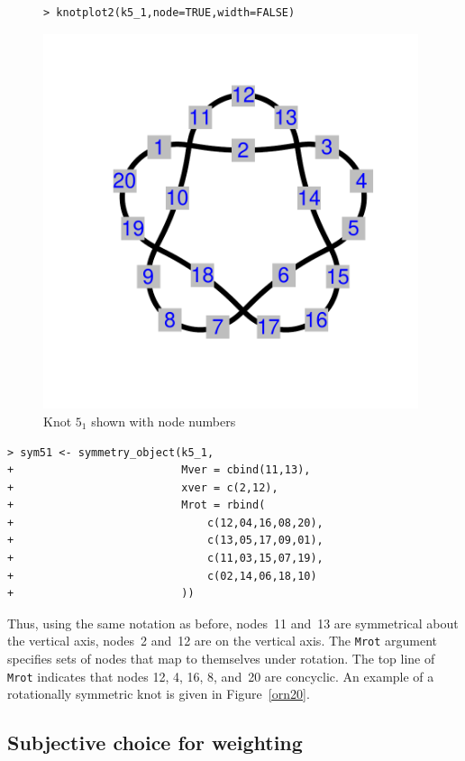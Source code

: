 \documentclass{birkjour}
\theoremstyle{definition}
\theoremstyle{remark}
\numberwithin{equation}{section}
\begin{document}
\begin{figure}[htbp]
  \begin{center}
\begin{verbatim}
> knotplot2(k5_1,node=TRUE,width=FALSE)
\end{verbatim}
\includegraphics[width=11cm]{knot-k5_1}  %
\caption{Knot $5_1$ \label{k5_1_twoknots} shown with node numbers}
  \end{center}
\end{figure}

\begin{verbatim}
> sym51 <- symmetry_object(k5_1,
+                          Mver = cbind(11,13),
+                          xver = c(2,12),
+                          Mrot = rbind(
+                              c(12,04,16,08,20),
+                              c(13,05,17,09,01),
+                              c(11,03,15,07,19),
+                              c(02,14,06,18,10)
+                          ))
\end{verbatim}

Thus, using the same notation as before, nodes~11 and~13 are
symmetrical about the vertical axis, nodes~2 and~12 are on the
vertical axis.  The {\tt Mrot} argument specifies sets of nodes that
map to themselves under rotation.  The top line of {\tt Mrot}
indicates that nodes 12, 4, 16, 8, and~20 are concyclic.  An example
of a rotationally symmetric knot is given in Figure~\ref{orn20}.  

\subsection{Subjective \label{section_cca} choice for weighting}
\end{document}
